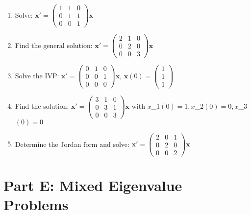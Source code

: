 \documentclass[12pt]{article}
\begin{document}
\begin{enumerate}[start=16]
\item Solve: $\mathbf{x}' = \begin{pmatrix} 1 & 1 & 0 \\ 0 & 1 & 1 \\ 0 & 0 & 1 \end{pmatrix}\mathbf{x}$

\item Find the general solution: $\mathbf{x}' = \begin{pmatrix} 2 & 1 & 0 \\ 0 & 2 & 0 \\ 0 & 0 & 3 \end{pmatrix}\mathbf{x}$

\item Solve the IVP: $\mathbf{x}' = \begin{pmatrix} 0 & 1 & 0 \\ 0 & 0 & 1 \\ 0 & 0 & 0 \end{pmatrix}\mathbf{x}$, $\mathbf{x}(0) = \begin{pmatrix} 1 \\ 1 \\ 1 \end{pmatrix}$

\item Find the solution: $\mathbf{x}' = \begin{pmatrix} 3 & 1 & 0 \\ 0 & 3 & 1 \\ 0 & 0 & 3 \end{pmatrix}\mathbf{x}$ with $x$_{1}$(0) = 1, x$_{2}$(0) = 0, x$_{3}$(0) = 0$

\item Determine the Jordan form and solve: $\mathbf{x}' = \begin{pmatrix} 2 & 0 & 1 \\ 0 & 2 & 0 \\ 0 & 0 & 2 \end{pmatrix}\mathbf{x}$
\end{enumerate}

\section*{Part E: Mixed Eigenvalue Problems}
\end{document}
